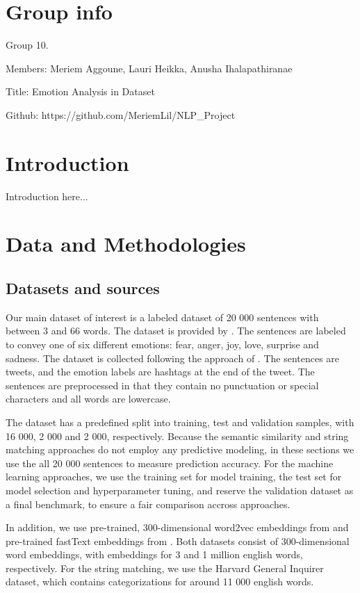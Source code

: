 \documentclass[conference]{IEEEtran}
\begin{document}
\section{Group info}
Group 10.

Members: Meriem Aggoune, Lauri Heikka, Anusha Ihalapathiranae

Title: Emotion Analysis in Dataset

Github: https://github.com/MeriemLil/NLP\_Project

\section{Introduction}
Introduction here...

\section{Data and Methodologies}
\subsection{Datasets and sources}
Our main dataset of interest is a labeled dataset of 20 000 sentences with between 3 and 66 words. The dataset is provided by \cite{kaggledata}. The sentences are labeled to convey one of six different emotions: fear, anger, joy, love, surprise and sadness. The dataset is collected following the approach of \cite{saravia-etal-2018-carer}. The sentences are tweets, and the emotion labels are hashtags at the end of the tweet. The sentences are preprocessed in that they contain no punctuation or special characters and all words are lowercase.

The dataset has a predefined split into training, test and validation samples, with 16 000, 2 000 and 2 000, respectively. Because the semantic similarity and string matching approaches do not employ any predictive modeling, in these sections we use the all 20 000 sentences to measure prediction accuracy. For the machine learning approaches, we use the training set for model training, the test set for model selection and hyperparameter tuning, and reserve the validation dataset as a final benchmark, to ensure a fair comparison accross approaches.

In addition, we use pre-trained, 300-dimensional word2vec embeddings  from \cite{mikolov2013distributed} and pre-trained fastText embeddings from \cite{bojanowski2016enriching}. Both datasets consist of 300-dimensional word embeddings, with embeddings for 3 and 1 million english words, respectively. For the string matching, we use the Harvard General Inquirer dataset, which contains categorizations for around 11 000 english words.
\end{document}
